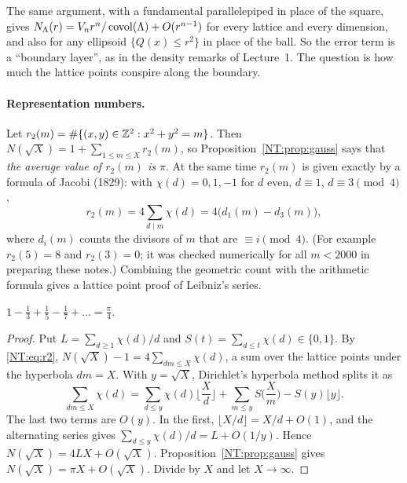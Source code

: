 The same argument, with a fundamental parallelepiped in place of the square, gives
$N_\Lambda(r)=V_nr^n/\operatorname{covol}(\Lambda)+O(r^{n-1})$ for every lattice and every dimension, and also for any
ellipsoid $\{Q(x)\le r^2\}$ in place of the ball. So the error term is a ``boundary layer'', as in the
density remarks of Lecture~1. The question is how much the lattice points conspire along the boundary.

\paragraph{Representation numbers.} Let $r_2(m)=\#\{(x,y)\in\mathbb{Z}^2:x^2+y^2=m\}$. Then
$N(\sqrt X)=1+\sum_{1\le m\le X}r_2(m)$, so Proposition~\ref{NT:prop:gauss} says that \emph{the average
value of $r_2(m)$ is $\pi$}. At the same time $r_2(m)$ is given exactly by a formula of Jacobi (1829):
with $\chi(d)=0,1,-1$ for $d$ even, $d\equiv1$, $d\equiv3\pmod4$,
\begin{equation}\label{NT:eq:r2}
  r_2(m)=4\sum_{d\mid m}\chi(d)=4\big(d_1(m)-d_3(m)\big),
\end{equation}
where $d_i(m)$ counts the divisors of $m$ that are $\equiv i\pmod 4$. (For example $r_2(5)=8$ and
$r_2(3)=0$; it was checked numerically for all $m<2000$ in preparing these notes.) Combining the
geometric count with the arithmetic formula gives a lattice point proof of Leibniz's series.

\begin{proposition}\label{NT:prop:leibniz}
$1-\frac13+\frac15-\frac17+\dots=\frac\pi4$.
\end{proposition}

\begin{proof}
Put $L=\sum_{d\ge1}\chi(d)/d$ and $S(t)=\sum_{d\le t}\chi(d)\in\{0,1\}$. By \eqref{NT:eq:r2},
$N(\sqrt X)-1=4\sum_{dm\le X}\chi(d)$, a sum over the lattice points under the hyperbola $dm=X$. With
$y=\sqrt X$, Dirichlet's hyperbola method splits it as
\[
  \sum_{dm\le X}\chi(d)=\sum_{d\le y}\chi(d)\Big\lfloor\frac Xd\Big\rfloor+\sum_{m\le y}S\Big(\frac Xm\Big)-S(y)\lfloor y\rfloor .
\]
The last two terms are $O(y)$. In the first, $\lfloor X/d\rfloor=X/d+O(1)$, and the alternating series
gives $\sum_{d\le y}\chi(d)/d=L+O(1/y)$. Hence $N(\sqrt X)=4LX+O(\sqrt X)$. Proposition~\ref{NT:prop:gauss}
gives $N(\sqrt X)=\pi X+O(\sqrt X)$. Divide by $X$ and let $X\to\infty$.
\end{proof}

